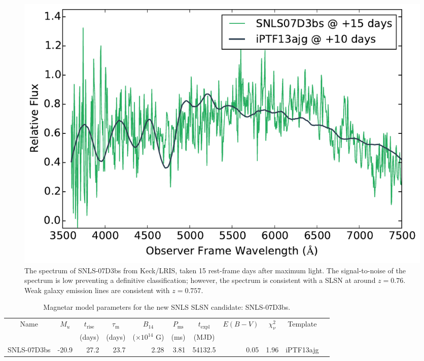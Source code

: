\begin{figure}
\centering
\includegraphics[scale=0.5]{Figures/Chapter3/07D3bsSpec}
\caption{The spectrum of SNLS-07D3bs from Keck/LRIS, taken 15 rest-frame days after maximum light. The signal-to-noise of the spectrum is low preventing a definitive classification; however, the spectrum is consistent with a SLSN at around $z=0.76$. Weak galaxy emission lines are consistent with $z=0.757$.}
\label{fig:07D3bsSpec}
\end{figure}

\begin{table}
\begin{center}
\caption{Magnetar model parameters for the new SNLS SLSN candidate: SNLS-07D3bs.}
\label{tab:07d3bsParams}
\begin{tabular}{|l|r|r|r|r|r|r|r|r|r|r|}
\hline
  \multicolumn{1}{|c|}{Name} &
  \multicolumn{1}{c|}{$M_u$} &
  \multicolumn{1}{c|}{$t_\mathrm{rise}$} &
  \multicolumn{1}{c|}{$\tau_\mathrm{m}$} &
  \multicolumn{1}{c|}{$B_{14}$} &
  \multicolumn{1}{c|}{$P_{\mathrm{ms}}$} &
  \multicolumn{1}{c|}{$t_\mathrm{expl}$} &
  \multicolumn{1}{c|}{$E(B-V)$} &
  \multicolumn{1}{c|}{$\chi^2_{\nu}$} &
  \multicolumn{1}{c|}{Template} \\ & &
  \multicolumn{1}{c|}{(days)} &
  \multicolumn{1}{c|}{(days)} &
  \multicolumn{1}{c|}{($\times10^{14}$ G)} &
  \multicolumn{1}{c|}{(ms)} &
  \multicolumn{1}{c|}{(MJD)} & \\
\hline
SNLS-07D3bs & -20.9 &  27.2 & 23.7 & 2.28 & 3.81 & 54132.5 & 0.05 & 1.96 & iPTF13ajg\\
\hline
\end{tabular}
\end{center}
\end{table}

